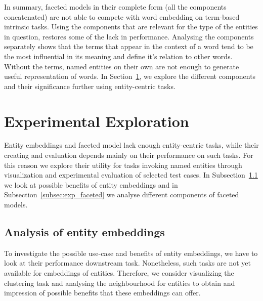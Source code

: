 In summary, faceted models in their complete form (all the components concatenated) are not able to compete with word embedding on term-based intrinsic tasks. Using the components that are relevant for the type of the entities in question, restores some of the lack in performance. Analysing the components separately shows that the terms that appear in the context of a word tend to be the most influential in its meaning and define it's relation to other words. Without the terms, named entities on their own are not enough to generate useful representation of words.  In Section~\ref{sec:eval_experimental}, we explore the different components and their significance further using entity-centric tasks. 

\section{Experimental Exploration}\label{sec:eval_experimental}
Entity embeddings and faceted model lack enough entity-centric tasks, while their creating and evaluation depends mainly on their performance on such tasks. For this reason we explore their utility for tasks invoking named entities through visualization and experimental evaluation of selected test cases. In Subsection~\ref{subsec:exp_entity} we look at possible benefits of entity embeddings and in Subsection~\ref{subsec:exp_faceted} we analyse different components of faceted models. 

\subsection{Analysis of entity embeddings}\label{subsec:exp_entity}
To investigate the possible use-case and benefits of entity embeddings, we have to look at their performance downstream task. Nonetheless, such tasks are not yet available for embeddings of entities. Therefore, we consider visualizing the clustering task and analysing the neighbourhood for entities to obtain and impression of possible benefits that these embeddings can offer. 

